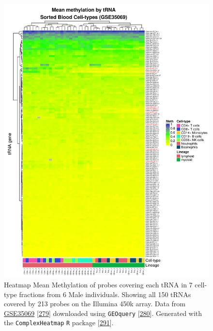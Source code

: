 \documentclass[
]{book}
\begin{document}
\begin{figure}

{\centering \includegraphics[width=0.9\linewidth]{./figs/meanMethbytRNAMatHeatmapLow_bl} 

}

\caption{Heatmap Mean Methylation of probes covering each tRNA in 7 cell-type fractions from 6 Male individuals. Showing all 150 tRNAs covered by 213 probes on the Illumina 450k array. Data from \href{https://www.ncbi.nlm.nih.gov/geo/query/acc.cgi?acc=GSE35069}{GSE35069} {[}\protect\hyperlink{ref-Reinius2012}{279}{]} downloaded using \texttt{GEOquery} {[}\protect\hyperlink{ref-Davis2007p}{280}{]}. Generated with the \texttt{ComplexHeatmap} \texttt{R} package {[}\protect\hyperlink{ref-Gu2016}{291}{]}.}\label{fig:meanMethbytRNAMatHeatmapLow}
\end{figure}
\end{document}
